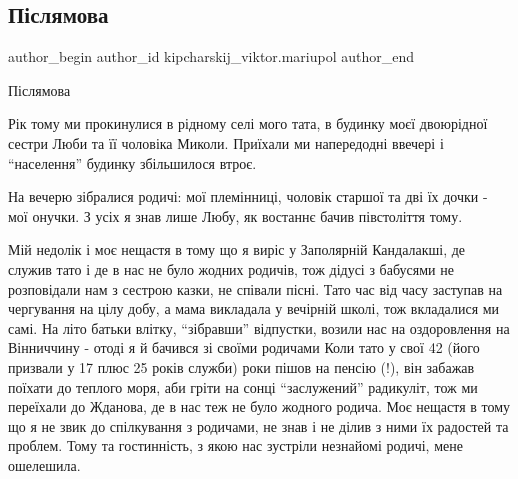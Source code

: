  
 
 
 
 

\subsection{Післямова}
\label{sec:19_03_2023.fb.kipcharskij_viktor.mariupol.1.p_slyamova}

\ifcmt
 author_begin
   author_id kipcharskij_viktor.mariupol
 author_end
\fi

Післямова

Рік тому ми прокинулися в рідному селі мого тата, в будинку моєї двоюрідної
сестри Люби та її чоловіка Миколи. Приїхали ми напередодні ввечері і
\enquote{населення} будинку збільшилося втроє.

На вечерю зібралися родичі: мої племінниці, чоловік старшої та дві їх дочки -
мої онучки. З усіх я знав лише Любу, як востаннє бачив півстоліття тому. 


Мій недолік і моє нещастя в тому що я виріс у Заполярній Кандалакші, де служив
тато і де в нас не було жодних родичів, тож дідусі з бабусями не розповідали
нам з сестрою казки, не співали пісні. Тато час від часу заступав на чергування
на цілу добу, а мама викладала у вечірній школі, тож вкладалися ми самі. На
літо батьки влітку, \enquote{зібравши} відпустки, возили нас на оздоровлення на
Вінниччину - отоді я й бачився зі своїми родичами Коли тато у свої 42 (його
призвали у 17 плюс 25 років служби) роки пішов на пенсію (!), він забажав
поїхати до теплого моря, аби гріти на сонці \enquote{заслужений} радикуліт, тож ми
переїхали до Жданова, де в нас теж не було жодного родича. Моє нещастя в тому
що я не звик до спілкування з родичами, не знав і не ділив з ними їх радостей
та проблем. Тому та гостинність, з якою нас зустріли незнайомі родичі, мене
ошелешила.

